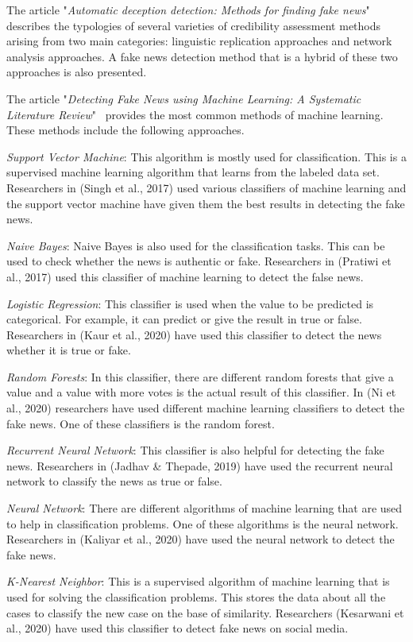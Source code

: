 The article "\textit{Automatic deception detection: Methods for finding fake news}"~\cite{4} describes the typologies of several varieties of credibility assessment methods arising from two main categories: linguistic replication approaches and network analysis approaches.
A fake news detection method that is a hybrid of these two approaches is also presented.

The article "\textit{Detecting Fake News using Machine Learning: A Systematic Literature Review}"~\cite{8} provides the most common methods of machine learning.
These methods include the following approaches.

\textit{Support Vector Machine}: This algorithm is mostly used for classification.
This is a supervised  machine learning algorithm that learns from the labeled data set.
Researchers in (Singh et al., 2017) used various classifiers of machine learning and the support vector machine have given them the best results in detecting the fake news.

\textit{Naive Bayes}: Naive Bayes is also used for the classification tasks.
This can be used to check whether the news is authentic or fake.
Researchers in (Pratiwi et al., 2017) used this classifier of machine learning to detect the false news.

\textit{Logistic Regression}: This classifier is used when the value to be predicted is categorical.
For example, it can predict or give the result in true or false.
Researchers in (Kaur et al., 2020) have used this classifier to detect the news whether it is true or fake.

\textit{Random Forests}: In this classifier, there are different random forests that give a value and a value with more votes is the actual result of this classifier.
In (Ni et al., 2020) researchers have used different machine learning classifiers to detect the fake news.
One of these classifiers is the random forest.

\textit{Recurrent Neural Network}: This classifier is also helpful for detecting the fake news.
Researchers in (Jadhav \& Thepade, 2019) have used the recurrent neural network to classify the news as true or false.

\textit{Neural Network}: There are different algorithms of machine learning that are used to help in classification problems.
One of these algorithms is the neural network.
Researchers in (Kaliyar et al., 2020) have used the neural network to detect the fake news.

\textit{K-Nearest Neighbor}: This is a supervised algorithm of machine learning that is used for solving the classification problems.
This stores the data about all the cases to classify the new case on the base of similarity.
Researchers (Kesarwani et al., 2020) have used this classifier to detect fake news on social media.

